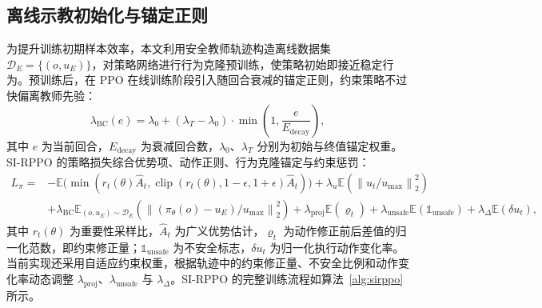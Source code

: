 \subsection{离线示教初始化与锚定正则}
为提升训练初期样本效率，本文利用安全教师轨迹构造离线数据集 $\mathcal D_E=\{(o,u_E)\}$，对策略网络进行行为克隆预训练，使策略初始即接近稳定行为\cite{rajeswaran2018learning,nair2018overcoming,zhang2018pretraining}。预训练后，在 PPO 在线训练阶段引入随回合衰减的锚定正则，约束策略不过快偏离教师先验：
\begin{equation}
\lambda_{\mathrm{BC}}(e)=\lambda_0+(\lambda_T-\lambda_0)\cdot\min\!\left(1,\frac{e}{E_{\mathrm{decay}}}\right),
\label{eq:anchor_decay}
\end{equation}
其中 $e$ 为当前回合，$E_{\mathrm{decay}}$ 为衰减回合数，$\lambda_0$、$\lambda_T$ 分别为初始与终值锚定权重。SI-RPPO 的策略损失综合优势项、动作正则、行为克隆锚定与约束惩罚：
\begin{equation}
\begin{aligned}
L_\pi={}&-\mathbb E\bigl(\min(r_t(\theta)\hat A_t,\operatorname{clip}(r_t(\theta),1-\epsilon,1+\epsilon)\hat A_t)\bigr)
+\lambda_u\mathbb E\!\left(\left\|u_t/u_{\max}\right\|_2^2\right)\\
&+\lambda_{\mathrm{BC}}\mathbb E_{(o,u_E)\sim\mathcal D_E}\!\left(\left\|(\pi_\theta(o)-u_E)/u_{\max}\right\|_2^2\right)
+\lambda_{\mathrm{proj}}\mathbb E(\varrho_t)
+\lambda_{\mathrm{unsafe}}\mathbb E(\mathbb 1_{\mathrm{unsafe}})
+\lambda_{\Delta}\mathbb E(\delta u_t),
\end{aligned}
\label{eq:sirppo_loss}
\end{equation}
其中 $r_t(\theta)$ 为重要性采样比，$\hat A_t$ 为广义优势估计，$\varrho_t$ 为动作修正前后差值的归一化范数，即约束修正量；$\mathbb 1_{\mathrm{unsafe}}$ 为不安全标志，$\delta u_t$ 为归一化执行动作变化率。当前实现还采用自适应约束权重，根据轨迹中的约束修正量、不安全比例和动作变化率动态调整 $\lambda_{\mathrm{proj}}$、$\lambda_{\mathrm{unsafe}}$ 与 $\lambda_{\Delta}$。SI-RPPO 的完整训练流程如算法~\ref{alg:sirppo} 所示。

